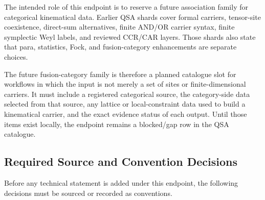 The intended role of this endpoint is to reserve a future association family
for categorical kinematical data.  Earlier QSA shards cover formal carriers,
tensor-site coexistence, direct-sum alternatives, finite AND/OR carrier
syntax, finite symplectic Weyl labels, and reviewed CCR/CAR layers.  Those
shards also state that para, statistics, Fock, and fusion-category
enhancements are separate choices.

The future fusion-category family is therefore a planned catalogue slot for
workflows in which the input is not merely a set of sites or finite-dimensional
carriers.  It must include a registered categorical source, the category-side
data selected from that source, any lattice or local-constraint data used to
build a kinematical carrier, and the exact evidence status of each output.
Until those items exist locally, the endpoint remains a blocked/gap row in the
QSA catalogue.

\subsection{Required Source and Convention Decisions}

Before any technical statement is added under this endpoint, the following
decisions must be sourced or recorded as conventions.

